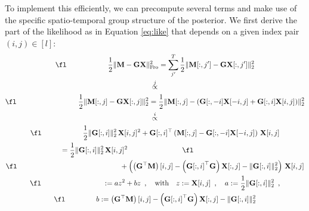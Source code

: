 To implement this efficiently, we can precompute several terms and make use of the specific spatio-temporal group structure of the posterior. We first derive the part of the likelihood as in Equation \eqref{eq:like} that depends on a given index pair $(i,j) \in [l]$:
\begin{gather*}
\fl \hspace{2cm} \frac{1}{2} \fronormsq{\bfM - \bfG \bfX} = \sum_{j'}^{T} \frac{1}{2} \norm{\bfM[:,j'] - \bfG \bfX[:,j']}_2^2 \\
\proptoab{j} \\
\fl \hspace{3cm} \frac{1}{2} \norm{\bfM[:,j] - \bfG \bfX[:,j]}_2^2 = \frac{1}{2} \norm{\bfM[:,j] - \left( \bfG[:, -i] \bfX[-i,j] + \bfG[:, i] \bfX[i,j] \right)}_2^2 \\
\proptoab{i} \\
\fl \hspace{2cm} \frac{1}{2} \norm{\bfG[:,i]}_2^2 \, \bfX[i,j]^2 + \bfG[:,i]^\top \left(\bfM[:,j] - \bfG[:,-i] \bfX[-i,j] \right) \, \bfX[i,j] \\
\fl \hspace{-6.5cm} = \frac{1}{2} \norm{\bfG[:,i]}_2^2 \, \bfX[i,j]^2 \\
\fl \hspace{5cm} + \left( \left( \bfG^\top \bfM\right)[i,j] - \left({\bfG[:,i]}^\top \bfG\right) \bfX[:,j] - \norm{\bfG[:,i]}_2^2 \right) \, \bfX[i,j]\\
\fl\hspace{3cm} := a z^2 + b z \enspace , \quad \text{with} \quad z := \bfX[i,j] \enspace , \quad a := \frac{1}{2} \norm{\bfG[:,i]}_2^2 \enspace , \\
\fl \hspace{1.5cm} b :=  \left( \bfG^\top \bfM\right)[i,j] - \left({\bfG[:,i]}^\top \bfG\right) \bfX[:,j] - \norm{\bfG[:,i]}_2^2
\end{gather*}

